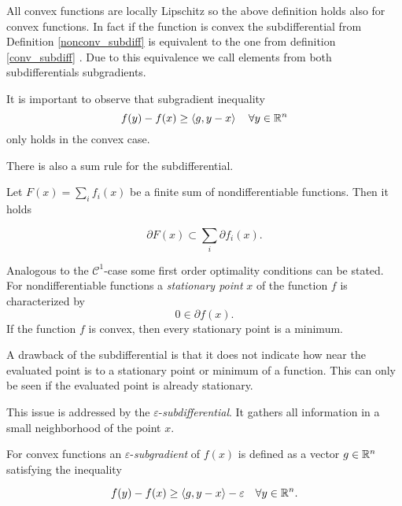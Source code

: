 All convex functions are locally Lipschitz \cite[Theorem 3.1.1, p. 16]{Hiriart-Urruty1996} so the above definition holds also for convex functions. In fact if the function is convex the subdifferential from Definition \ref{nonconv_subdiff} is equivalent to the one from definition \ref{conv_subdiff} \cite[Proposition 2.2.7, p. 36]{Clarke1990}.
Due to this equivalence we call elements from both subdifferentials subgradients.

\begin{remark}
	It is important to observe that subgradient inequality 
	\begin{equation}
	f(y)-f(x) \geq \left\langle g,y-x \right\rangle \quad \forall y \in \mathbb{R}^n 
\label{subgr_inequ}
\end{equation}
	only holds in the convex case.
\end{remark}

There is also a sum rule for the subdifferential.

\begin{proposition}
	Let \(F(x)=\sum_i{f_i(x)}\) be a finite sum of nondifferentiable functions. Then it holds
	
	\[ \partial F(x) \subset \sum_i{\partial f_i(x)}. \]
\end{proposition}

Analogous to the \(\mathcal{C}^1\)-case some first order optimality conditions can be stated.
For nondifferentiable functions a \emph{stationary point} \(x\) of the function \(f\) is characterized by \cite[p. 38]{Clarke1990}
\[ 0 \in \partial f(x). \]
If the function \(f\) is convex, then every stationary point is a minimum.


A drawback of the subdifferential is that it does not indicate how near the evaluated point is to a stationary point or minimum of a function. This can only be seen if the evaluated point is already stationary.

This issue is addressed by the \(\varepsilon\)-\emph{subdifferential}. It gathers all information in a small neighborhood of the point \(x\).

For convex functions an \(\varepsilon\)-\emph{subgradient} of \(f(x)\) is defined as a vector \(g \in \mathbb{R}^n\) satisfying the inequality

\[ f(y)-f(x) \geq \left\langle g,y-x \right\rangle - \varepsilon \quad \forall y \in \mathbb{R}^n.\]

